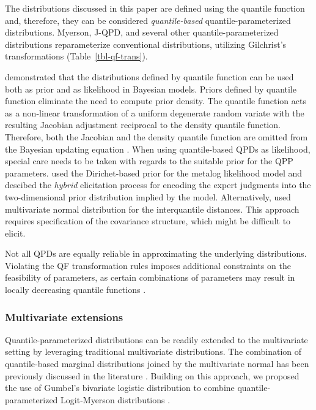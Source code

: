 \documentclass[
  fleqn,
  deca,
  blindrev
]{informs4}
\begin{document}
The distributions discussed in this paper are defined using the quantile
function and, therefore, they can be considered \emph{quantile-based}
quantile-parameterized distributions. Myerson, J-QPD, and several other
quantile-parameterized distributions reparameterize conventional
distributions, utilizing Gilchrist's transformations
(Table~\ref{tbl-qf-trans}).

\citet{perepolkin2023TenetsQuantilebasedInference} demonstrated that the
distributions defined by quantile function can be used both as prior and
as likelihood in Bayesian models. Priors defined by quantile function
eliminate the need to compute prior density. The quantile function acts
as a non-linear transformation of a uniform degenerate random variate
with the resulting Jacobian adjustment reciprocal to the density
quantile function. Therefore, both the Jacobian and the density quantile
function are omitted from the Bayesian updating equation
\citep{perepolkin2023TenetsQuantilebasedInference}. When using
quantile-based QPDs as likelihood, special care needs to be taken with
regards to the suitable prior for the QPP parameters.
\citet{perepolkin2021HybridElicitationIndirect} used the Dirichet-based
prior for the metalog likelihood model and descibed the \emph{hybrid}
elicitation process for encoding the expert judgments into the
two-dimensional prior distribution implied by the model. Alternatively,
\citet{wilson2023ReconciliationExpertPriors} used multivariate normal
distribution for the interquantile distances. This approach requires
specification of the covariance structure, which might be difficult to
elicit.

Not all QPDs are equally reliable in approximating the underlying
distributions. Violating the QF transformation rules imposes additional
constraints on the feasibility of parameters, as certain combinations of
parameters may result in locally decreasing quantile functions
\citep{keelin2016MetalogDistributions, hadlock2017QuantileparameterizedMethodsQuantifying}.

\subsubsection*{Multivariate extensions}\label{multivariate-extensions}

Quantile-parameterized distributions can be readily extended to the
multivariate setting by leveraging traditional multivariate
distributions. The combination of quantile-based marginal distributions
joined by the multivariate normal has been previously discussed in the
literature
\citep{drovandi2011LikelihoodfreeBayesianEstimation, hoff2007ExtendingRankLikelihood}.
Building on this approach, we proposed the use of Gumbel's bivariate
logistic distribution \citep{gumbel1961BivariateLogisticDistributions}
to combine quantile-parameterized Logit-Myerson distributions
\citep{wilson2023ReconciliationExpertPriors}.
\end{document}
